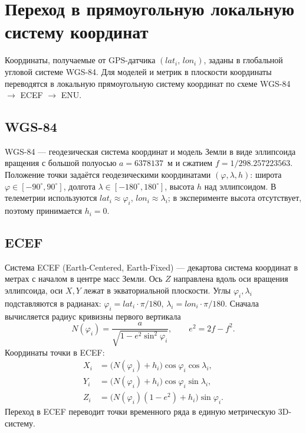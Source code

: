 \documentclass[a4paper,12pt]{report}
\begin{document}
	\section{Переход в прямоугольную локальную систему координат}
	Координаты, получаемые от GPS-датчика $(\mathit{lat}_i,\, \mathit{lon}_i)$, заданы в глобальной угловой системе WGS-84. Для моделей и метрик в плоскости координаты переводятся в локальную прямоугольную систему координат по схеме WGS-84 $\to$ ECEF $\to$ ENU.

	\subsection*{WGS-84}
	WGS-84 --- геодезическая система координат и модель Земли в виде эллипсоида вращения с большой полуосью $a=6378137$~м и сжатием $f=1/298.257223563$. Положение точки задаётся геодезическими координатами $(\varphi, \lambda, h)$: широта $\varphi \in [-90^\circ,90^\circ]$, долгота $\lambda \in [-180^\circ,180^\circ]$, высота $h$ над эллипсоидом. В телеметрии используются $\mathit{lat}_i \approx \varphi_i$, $\mathit{lon}_i \approx \lambda_i$; в эксперименте высота отсутствует, поэтому принимается $h_i = 0$.

	\subsection*{ECEF}
	Система ECEF (Earth-Centered, Earth-Fixed) --- декартова система координат в метрах с началом в центре масс Земли. Ось $Z$ направлена вдоль оси вращения эллипсоида, оси $X,Y$ лежат в экваториальной плоскости. Углы $\varphi_i, \lambda_i$ подставляются в радианах: $\varphi_i = \mathit{lat}_i \cdot \pi/180$, $\lambda_i = \mathit{lon}_i \cdot \pi/180$. Сначала вычисляется радиус кривизны первого вертикала
	\begin{equation*}
		N(\varphi_i)=\frac{a}{\sqrt{1-e^2\sin^2\varphi_i}}, \qquad e^2 = 2f - f^2.
	\end{equation*}
	Координаты точки в ECEF:
	\begin{align*}
		X_i &= \bigl(N(\varphi_i)+h_i\bigr)\cos\varphi_i\cos\lambda_i,\\
		Y_i &= \bigl(N(\varphi_i)+h_i\bigr)\cos\varphi_i\sin\lambda_i,\\
		Z_i &= \bigl(N(\varphi_i)(1-e^2)+h_i\bigr)\sin\varphi_i.
	\end{align*}
	Переход в ECEF переводит точки временного ряда в единую метрическую 3D-систему.
\end{document}
